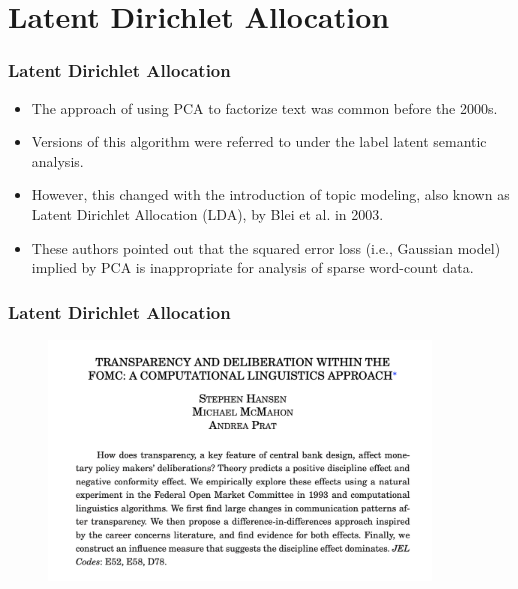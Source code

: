 \documentclass[
  shownotes,
  xcolor={svgnames},
  hyperref={colorlinks,citecolor=DarkBlue,linkcolor=DarkRed,urlcolor=DarkBlue}
  , aspectratio=169]{beamer}
\begin{document}
\section{Latent Dirichlet Allocation}
\begin{frame}
\frametitle{Latent Dirichlet Allocation}

\begin{itemize}


\item The approach of using PCA to factorize text was common before the 2000s. 
\medskip
\item Versions of this algorithm were referred to under the label latent semantic analysis. 
\medskip
\item However, this changed with the introduction of topic modeling, also known as Latent Dirichlet Allocation (LDA), by Blei et al. in 2003. 
\medskip
\item These authors pointed out that the squared error loss (i.e., Gaussian model) implied by PCA is inappropriate for analysis of sparse word-count data. 
\medskip

\end{itemize}

\end{frame}
\begin{frame}
\frametitle{Latent Dirichlet Allocation}

\begin{figure}[H] \centering
            \captionsetup{justification=centering}
              \includegraphics[width=4in]{figures/hansen1.png}
              
 \end{figure}

 \end{frame}
\end{document}
